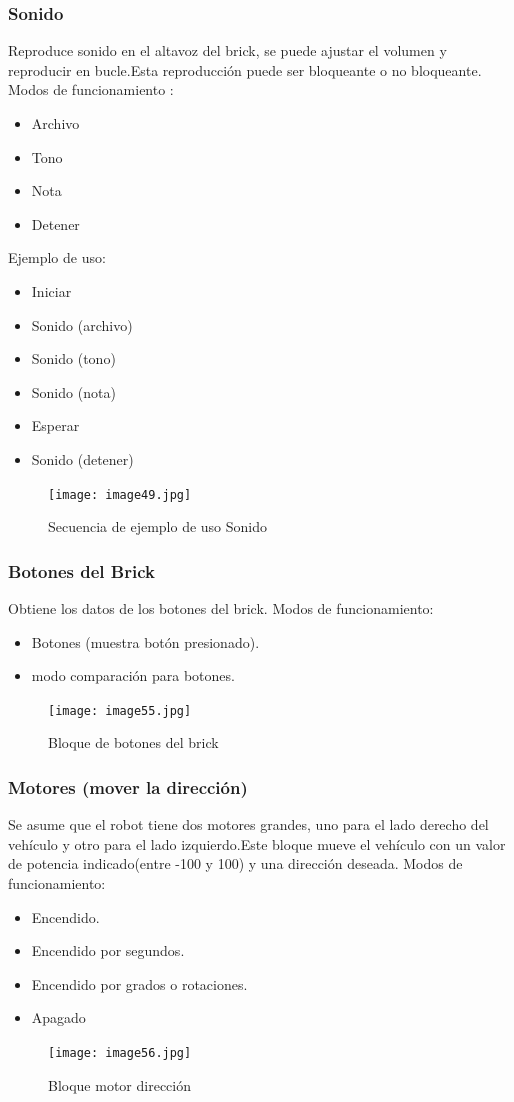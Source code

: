 \documentclass[12pt,a4paper]{article}
\begin{document}
\subsubsection{Sonido}
Reproduce sonido en el altavoz del brick, se puede ajustar el volumen y reproducir en bucle.Esta reproducción puede ser bloqueante o no bloqueante.
Modos de funcionamiento :
\begin{itemize}
\item Archivo
\item Tono
\item Nota
\item Detener
\end{itemize}
Ejemplo de uso:
\begin{itemize}
\item Iniciar
\item Sonido (archivo)
\item Sonido (tono)
\item Sonido (nota)
\item Esperar
\item Sonido (detener)
\end{itemize}
\begin{figure}[H]
	\caption{Secuencia de ejemplo de uso Sonido }
	\texttt{[image: image49.jpg]}
	\centering
\end{figure}
\subsubsection{Botones del Brick}
Obtiene los datos de los botones del brick.
Modos de funcionamiento:
\begin{itemize}
\item Botones (muestra botón presionado).
\item modo comparación para botones.
\end{itemize}
\begin{figure}[H]
	\caption{Bloque de botones del brick }
	\texttt{[image: image55.jpg]}
	\centering
\end{figure}
\subsubsection{Motores (mover la dirección)}
Se asume que el robot tiene dos motores grandes, uno para el lado derecho del vehículo y otro para el lado izquierdo.Este bloque mueve el vehículo con un valor de potencia indicado(entre -100 y 100) y una dirección deseada.
Modos de funcionamiento:
\begin{itemize}
\item Encendido.
\item Encendido por segundos.
\item Encendido por grados o rotaciones.
\item Apagado
\end{itemize}
\begin{figure}[H]
	\caption{Bloque motor dirección }
	\texttt{[image: image56.jpg]}
	\centering
\end{figure}
\end{document}
